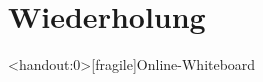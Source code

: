 

\section{Wiederholung}








\appendix

\begin{frame}<handout:0>[fragile]{Online-Whiteboard}
    \phantom{text}
\end{frame}



